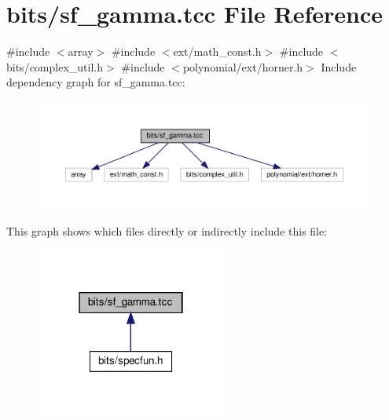 \hypertarget{sf__gamma_8tcc}{}\section{bits/sf\+\_\+gamma.tcc File Reference}
\label{sf__gamma_8tcc}
{\ttfamily \#include $<$array$>$}\newline
{\ttfamily \#include $<$ext/math\+\_\+const.\+h$>$}\newline
{\ttfamily \#include $<$bits/complex\+\_\+util.\+h$>$}\newline
{\ttfamily \#include $<$polynomial/ext/horner.\+h$>$}\newline
Include dependency graph for sf\+\_\+gamma.\+tcc\+:
\nopagebreak
\begin{figure}[H]
\begin{center}
\leavevmode
\includegraphics[width=350pt]{sf__gamma_8tcc__incl}
\end{center}
\end{figure}
This graph shows which files directly or indirectly include this file\+:
\nopagebreak
\begin{figure}[H]
\begin{center}
\leavevmode
\includegraphics[width=178pt]{sf__gamma_8tcc__dep__incl}
\end{center}
\end{figure}
